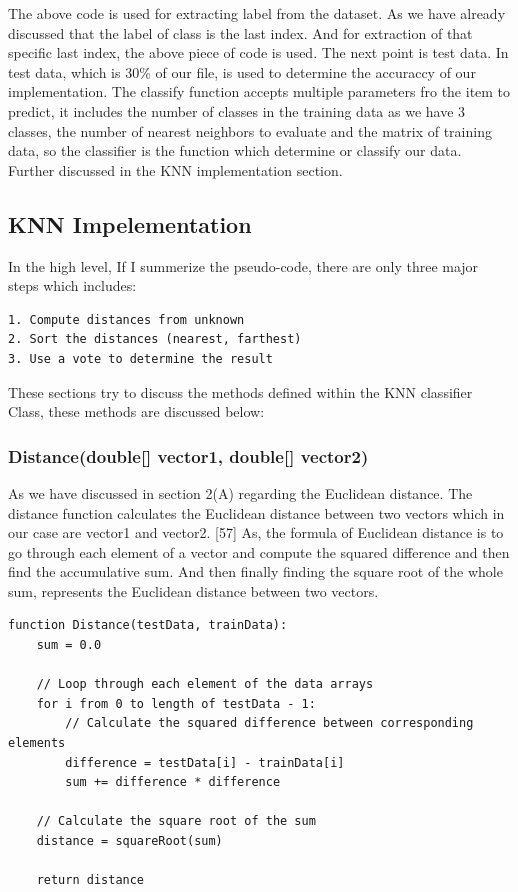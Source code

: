 \documentclass[conference]{IEEEtran}
\begin{document}
The above code is used for extracting label from the dataset. As we have already discussed that the label of class is the last index. And for extraction of that specific last index, the above piece of code is used. The next point is test data. In test data, which is 30\% of our file, is used to determine the accuraccy of our implementation. The classify function accepts multiple parameters fro the item to predict, it includes the number of classes in the training data as we have 3 classes, the number of nearest neighbors to evaluate and the matrix of training data, so the classifier is the function which determine or classify our data. Further discussed in the KNN implementation section. 





\subsection{KNN Impelementation}
In the high level, If I summerize the pseudo-code, there are only three major steps which includes:
\begin{lstlisting}
1. Compute distances from unknown
2. Sort the distances (nearest, farthest)
3. Use a vote to determine the result
\end{lstlisting}

These sections try to discuss the methods defined within the KNN classifier Class, these methods are discussed below:

\subsubsection{Distance(double[] vector1, double[] vector2)}
As we have discussed in section 2(A) regarding the Euclidean distance. The distance function calculates the Euclidean distance between two vectors which in our case are vector1 and vector2. [57] As, the formula of Euclidean distance is to go through each element of a vector and compute the squared difference and then find the accumulative sum. And then finally finding the square root of the whole sum, represents the Euclidean distance between two vectors. 

\begin{lstlisting}
function Distance(testData, trainData):
    sum = 0.0
    
    // Loop through each element of the data arrays
    for i from 0 to length of testData - 1:
        // Calculate the squared difference between corresponding elements
        difference = testData[i] - trainData[i]
        sum += difference * difference
    
    // Calculate the square root of the sum
    distance = squareRoot(sum)
    
    return distance
\end{lstlisting}
\end{document}

